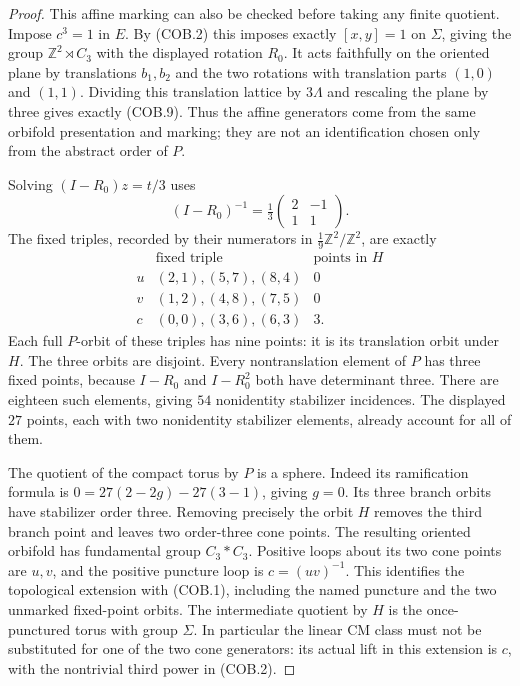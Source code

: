 \begin{proof}
This affine marking can also be checked before taking
any finite quotient. Impose $c^3=1$ in $E$.
By (COB.2) this imposes exactly $[x,y]=1$ on
$\Sigma$, giving the group $\mathbb Z^2\rtimes C_3$
with the displayed rotation $R_0$. It acts faithfully
on the oriented plane by translations $b_1,b_2$
and the two rotations with translation parts $(1,0)$
and $(1,1)$. Dividing this translation lattice by
$3\Lambda$ and rescaling the plane by three gives
exactly (COB.9). Thus the affine generators come
from the same orbifold presentation and marking;
they are not an identification chosen only from
the abstract order of $P$.

Solving $(I-R_0)z=t/3$ uses
\[
 (I-R_0)^{-1}=\tfrac13
                 \begin{pmatrix}2&-1\\1&1\end{pmatrix}.
                                                               \tag{COB.10}
\]
The fixed triples, recorded by their numerators in
$\frac19\mathbb Z^2/\mathbb Z^2$, are exactly
\[
\begin{array}{c|c|c}
 &\text{fixed triple}&\text{points in }H\\ \hline
 u&(2,1),(5,7),(8,4)&0\\
 v&(1,2),(4,8),(7,5)&0\\
 c&(0,0),(3,6),(6,3)&3.
\end{array}
                                                               \tag{COB.11}
\]
Each full $P$-orbit of these triples has nine points:
it is its translation orbit under $H$. The three
orbits are disjoint. Every nontranslation element of
$P$ has three fixed points, because $I-R_0$ and
$I-R_0^2$ both have determinant three. There are
eighteen such elements, giving $54$ nonidentity
stabilizer incidences. The displayed $27$ points,
each with two nonidentity stabilizer elements, already
account for all of them.

The quotient of the compact torus by $P$ is a sphere.
Indeed its ramification formula is
$0=27(2-2g)-27(3-1)$, giving $g=0$.
Its three branch orbits have stabilizer order three.
Removing precisely the orbit $H$ removes the third
branch point and leaves two order-three cone points.
The resulting oriented orbifold has fundamental group
$C_3*C_3$. Positive loops about its two cone points
are $u,v$, and the positive puncture loop is
$c=(uv)^{-1}$. This identifies the topological extension
with (COB.1), including the named puncture and the two
unmarked fixed-point orbits. The intermediate quotient
by $H$ is the once-punctured torus with group $\Sigma$.
In particular the linear CM class must not be
substituted for one of the two cone generators:
its actual lift in this extension is $c$, with the
nontrivial third power in (COB.2).


\end{proof}
